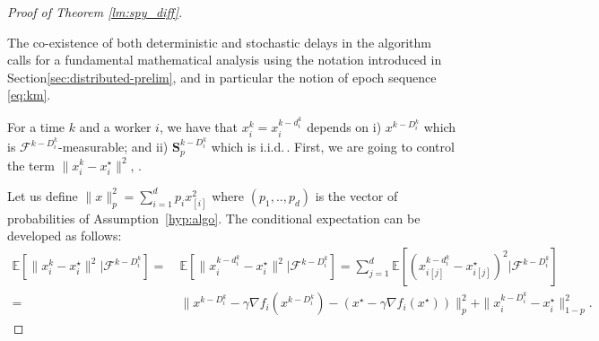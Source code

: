 \begin{proof}[Proof of Theorem \ref{lm:spy_diff}]\label{apx:proofsparse}


The co-existence of both deterministic and stochastic delays in the algorithm calls for a fundamental mathematical analysis using the notation introduced in Section\;\ref{sec:distributed-prelim}, and in particular the notion of epoch sequence \eqref{eq:km}.



For a time $k$ and a worker $i$, we have that $x_i^k = x_i^{k-d_i^k}$ depends on i) $x^{k-D_i^k}$ which is $\mathcal{F}^{k-D_i^k}$-measurable; and ii) $\mathbf{S}_p^{k-D_i^k}$ which is i.i.d.\,. First, we are going to control the term $\|x_i^k - x_i^\star\|^2$, .

Let us define $\|x\|_p^2 = \sum_{i=1}^d p_ix_{[i]}^2$ where  $(p_1,..,p_d)$ is the vector of probabilities of Assumption~\ref{hyp:algo}. The conditional  expectation can be developed as follows:
\begin{align*}
    \mathbb{E}[\|x_i^k - x_i^\star\|^2 | \mathcal{F}^{k-D_i^k} ]
    =~ &  \mathbb{E}[\|x_i^{k-d_i^k} - x_i^\star\|^2 | \mathcal{F}^{k-D_i^k} ] = \sum_{j=1}^d  \mathbb{E}[ (x_{i[j]}^{k-d_i^k} - x_{i[j]}^\star)^2 | \mathcal{F}^{k-D_i^k} ] \\ 
    =~ & \| x^{k-D_i^k} - \gamma \nabla f_i(x^{k-D_i^k})  - (  {x}^{\star} - \gamma \nabla f_i(x^\star) ) \|^2_p + \| x_{i}^{k-D_i^k} - {x}_{i}^{\star}\|^2_{1-p}.
\end{align*}



\end{proof}
